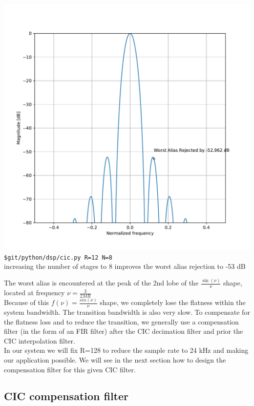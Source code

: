 \documentclass{article}
\begin{document}
\begin{center}
\begin{minipage}{0.40\linewidth}
		\includegraphics[width=0.99\linewidth]{cic_r12_n8.pdf} \\
		{\tt \$git/python/dsp/cic.py R=12 N=8} \\
		increasing the number of stages to 8
		improves the worst alias rejection to -53 dB
	\end{minipage}
\end{center}

The worst alias is encountered at the peak
of the 2nd lobe of the $\frac{\sin(\nu)}{\nu}$ shape, 
located at frequency $\nu = \frac{3}{2MR}$ \\

Because of this $f(\nu) = \frac{sin(\nu)}{\nu}$ shape,
we completely lose the flatness within the system
bandwidth. The transition bandwidth is also very slow.
To compensate for the flatness loss and to reduce
the transition, 
we generally use a compensation filter (in the form of an FIR
filter) after the CIC decimation filter
and prior the CIC interpolation filter. \\

In our system we will fix R=128 to reduce
the sample rate to 24 kHz and making our application
possible. We will see in the next section
how to design the compensation filter for this given
CIC filter.

\subsection{CIC compensation filter}
\end{document}
